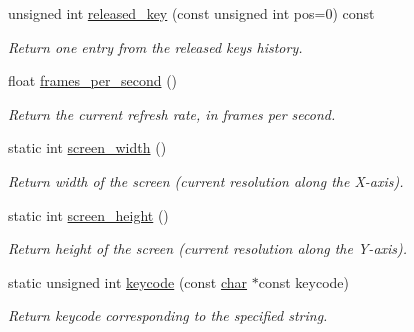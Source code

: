 \begin{DoxyCompactItemize}
unsigned int \hyperlink{structcimg__library__suffixed_1_1CImgDisplay_a537d30bd26b82bc6ed4afc8777adb097}{released\+\_\+key} (const unsigned int pos=0) const
\begin{DoxyCompactList}\small\item\em Return one entry from the released keys history. \end{DoxyCompactList}\item 
float \hyperlink{structcimg__library__suffixed_1_1CImgDisplay_ac98fc29fc303ea835a630ab2253cb7b4}{frames\+\_\+per\+\_\+second} ()
\begin{DoxyCompactList}\small\item\em Return the current refresh rate, in frames per second. \end{DoxyCompactList}\item 
\mbox{\label{structcimg__library__suffixed_1_1CImgDisplay_ab3681646247ba684f7161cf13b2ce624}} 
static int \hyperlink{structcimg__library__suffixed_1_1CImgDisplay_ab3681646247ba684f7161cf13b2ce624}{screen\+\_\+width} ()
\begin{DoxyCompactList}\small\item\em Return width of the screen (current resolution along the X-\/axis). \end{DoxyCompactList}\item 
\mbox{\label{structcimg__library__suffixed_1_1CImgDisplay_a7d6abd2c5735049f6518e73b28fe278d}} 
static int \hyperlink{structcimg__library__suffixed_1_1CImgDisplay_a7d6abd2c5735049f6518e73b28fe278d}{screen\+\_\+height} ()
\begin{DoxyCompactList}\small\item\em Return height of the screen (current resolution along the Y-\/axis). \end{DoxyCompactList}\item 
static unsigned int \hyperlink{structcimg__library__suffixed_1_1CImgDisplay_a09c59cb4778b64e31884fccca321839b}{keycode} (const \hyperlink{classchar}{char} $\ast$const keycode)
\begin{DoxyCompactList}\small\item\em Return keycode corresponding to the specified string. \end{DoxyCompactList}\end{DoxyCompactItemize}
